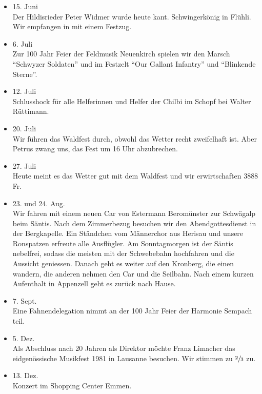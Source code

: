 \begin{history}
\begin{itemize}
        \item 15. Juni\\
              Der Hildisrieder Peter Widmer wurde heute kant. Schwingerkönig in
              Flühli. Wir empfangen in mit einem Festzug.

        \item 6. Juli\\
              Zur 100 Jahr Feier der Feldmusik Neuenkirch spielen wir den Marsch
              \enquote{Schwyzer Soldaten} und im Festzelt \enquote{Our Gallant Infantry} und
              \enquote{Blinkende Sterne}.

        \item 12. Juli\\
              Schlusshock für alle Helferinnen und Helfer der Chilbi im Schopf bei
              Walter Rüttimann.

        \item 20. Juli\\
              Wir führen das Waldfest durch, obwohl das Wetter recht zweifelhaft ist.
              Aber Petrus zwang uns, das Fest um 16 Uhr abzubrechen.

        \item 27. Juli\\
              Heute meint es das Wetter gut mit dem Waldfest und wir erwirtschaften
              3888 Fr.

        \item 23. und 24. Aug.\\
              Wir fahren mit einem neuen Car von Estermann Beromünster zur Schwägalp
              beim Säntis. Nach dem Zimmerbezug besuchen wir den Abendgottesdienst in
              der Bergkapelle. Ein Ständchen vom Männerchor aus Herisau und unsere
              Ronspatzen erfreute alle Ausflügler. Am Sonntagmorgen ist der Säntis
              nebelfrei, sodass die meisten mit der Schwebebahn hochfahren und die
              Aussicht geniessen. Danach geht es weiter auf den Kronberg, die einen
              wandern, die anderen nehmen den Car und die Seilbahn. Nach einem kurzen
              Aufenthalt in Appenzell geht es zurück nach Hause.

        \item 7. Sept.\\
              Eine Fahnendelegation nimmt an der 100 Jahr Feier der Harmonie Sempach
              teil.

        \item 5. Dez.\\
              Als Abschluss nach 20 Jahren als Direktor möchte Franz Limacher das
              eidgenössische Musikfest 1981 in Lausanne besuchen. Wir stimmen zu
              $\sfrac{2}{3}$ zu.

        \item 13. Dez.\\
              Konzert im Shopping Center Emmen.


    \end{itemize}

\end{history}
